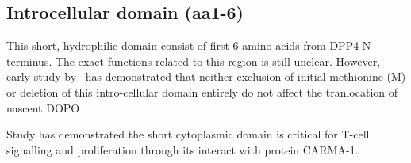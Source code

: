 \subsection{Introcellular domain (aa1-6)}

This short, hydrophilic domain consist of first 6 amino acids from DPP4 N-terminus. The exact functions related to this region is still unclear. However, early study by~\citet{Hong1990} has demonstrated that neither exclusion of initial methionine (M) or deletion of this intro-cellular domain entirely do not affect the tranlocation of nascent DOPO

Study has demonstrated the short cytoplasmic domain is critical for T-cell signalling and proliferation through its interact with protein CARMA-1. \cite{Ohnuma_2007}